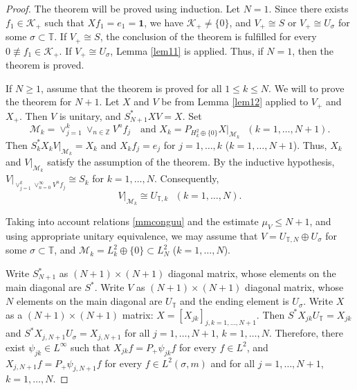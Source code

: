 \documentclass[10pt,a4paper]{amsart}
\begin{document}
\begin{proof} The theorem will be proved using induction. 
Let $N=1$. Since there exists $f_1\in\mathcal K_+$ such that $Xf_1=e_1=\mathbf{1}$, we have 
 $\mathcal K_+\neq\{0\}$, and $V_+\cong S$ or $V_+\cong U_\sigma$ for some $\sigma\subset\mathbb T$. If $V_+\cong S$, 
the conclusion of the theorem
is fulfilled for every $0\not\equiv f_1\in\mathcal K_+$. If $V_+\cong U_\sigma$, Lemma \ref{lem11} is applied.   
Thus, if $N=1$, then the theorem is proved.

If $N\geq 1$, assume that the theorem is proved for all $1\leq k\leq N$. 
We will to prove the theorem for $N+1$. Let $X$ and $V$ be from Lemma \ref{lem12} applied to $V_+$ and $X_+$. 
Then $V$ is unitary, and  $S_{N+1}^*XV=X$. Set
\begin{equation} \mathcal M_k=\vee_{j=1}^k\vee_{n\in\mathbb Z}V^n f_j 
\ \ \  \text{ and } X_k=P_{H_k^2\oplus\{0\}}X|_{\mathcal M_k} \ \ \ (k=1,\ldots, N+1). 
\end{equation} 
Then $S_k^*X_kV|_{\mathcal M_k} =X_k$ and $X_kf_j=e_j$ for $j=1, \ldots, k$ ($k=1,\ldots, N+1$). Thus,  
$X_k$ and $V|_{\mathcal M_k}$ satisfy the assumption of the theorem. By the inductive hypothesis, 
$V|_{\vee_{j=1}^k \vee_{n=0}^\infty V^n f_j}\cong S_k$ for $k=1, \ldots, N$. Consequently,
\begin{equation}\label{mmconguu} V|_{\mathcal M_k}\cong U_{\mathbb T,k}\ \ \  (k=1, \ldots, N). \end{equation}


Taking into account relations \eqref{mmconguu} and the estimate $\mu_V\leq N+1$, and using appropriate unitary equivalence, we may assume that $V=U_{\mathbb T,N}\oplus U_\sigma$ 
for some $\sigma\subset \mathbb T$, and $\mathcal M_k=L^2_k\oplus\{0\}\subset L^2_N$ ($k=1, \ldots, N$). 

Write $S_{N+1}^*$ as $(N+1)\times (N+1)$  diagonal   matrix, whose elements on the main diagonal are 
$S^*$. Write  $V$  as $(N+1)\times (N+1)$  diagonal   matrix, whose $N$ elements on the main diagonal are  $U_{\mathbb T}$
and the ending element is $U_\sigma$. Write $X$ as a $(N+1)\times (N+1)$ matrix: 
$X=[X_{jk}]_{j,k=1,\ldots, N+1}$.  
Then  $S^*X_{jk}U_{\mathbb T}=X_{jk}$  and $S^*X_{j, N+1}U_{\sigma}=X_{j, N+1}$ for all $j=1,\ldots, N+1$, $k=1,\ldots,N$. 
Therefore, there exist 
$\psi_{jk}\in L^\infty$ such that $X_{jk}f=P_+\psi_{jk} f$ for every $f\in L^2$, and $X_{j,N+1}f=P_+\psi_{j,N+1} f$ for every $f\in L^2(\sigma,m)$ and for all $j=1,\ldots, N+1$, $k=1,\ldots,N$.


\end{proof}
\end{document}
